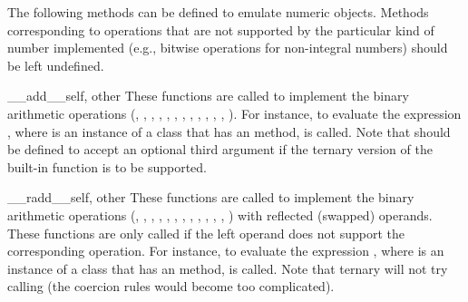 The following methods can be defined to emulate numeric objects.
Methods corresponding to operations that are not supported by the
particular kind of number implemented (e.g., bitwise operations for
non-integral numbers) should be left undefined.

\begin{methoddesc}{__add__}{self, other}
These functions are
called to implement the binary arithmetic operations (\code{+},
\code{-}, \code{*}, \code{/}, \code{\%},
,
, \code{**}, \code{<}\code{<},
\code{>}\code{>}, \code{\&}, \code{\^}, \code{|}).  For instance, to
evaluate the expression \code{+}, where  is an
instance of a class that has an  method,
 is called.  Note that
 should be defined to accept an optional third
argument if the ternary version of the built-in
 function is to be supported.
\end{methoddesc}

\begin{methoddesc}{__radd__}{self, other}
These functions are
called to implement the binary arithmetic operations (\code{+},
\code{-}, \code{*}, \code{/}, \code{\%},
,
, \code{**}, \code{<}\code{<},
\code{>}\code{>}, \code{\&}, \code{\^}, \code{|}) with reflected
(swapped) operands.  These functions are only called if the left
operand does not support the corresponding operation.  For instance,
to evaluate the expression \code{-}, where  is an
instance of a class that has an  method,
 is called.  Note that ternary
 will not try calling
 (the coercion rules would become too
complicated).
\end{methoddesc}

